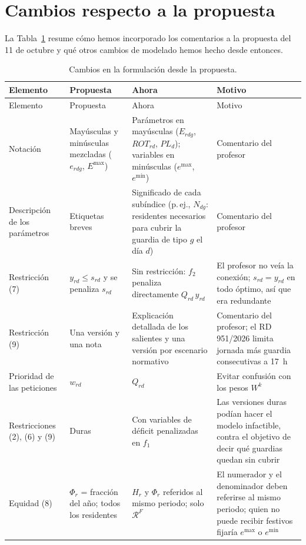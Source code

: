 \clearpage
\appendix
\section{Cambios respecto a la propuesta}
\label{app:feedback}

La Tabla~\ref{tab:cambios} resume cómo hemos incorporado los comentarios a la propuesta del 11 de octubre y qué otros cambios de modelado hemos hecho desde entonces.

{\small
\begin{longtable}{@{}p{2.8cm}p{3.5cm}p{4.2cm}p{4.6cm}@{}}
\caption{Cambios en la formulación desde la propuesta.}\label{tab:cambios}\\
\toprule
Elemento & Propuesta & Ahora & Motivo \\
\midrule
\endfirsthead
\toprule
Elemento & Propuesta & Ahora & Motivo \\
\midrule
\endhead
Notación & Mayúsculas y minúsculas mezcladas ($e_{rdg}$, $E^{\max}$) & Parámetros en mayúsculas ($E_{rdg}$, $ROT_{rd}$, $PL_d$); variables en minúsculas ($e^{\max}$, $e^{\min}$) & Comentario del profesor \\
Descripción de los parámetros & Etiquetas breves & Significado de cada subíndice (p.\,ej., $N_{dg}$: residentes necesarios para cubrir la guardia de tipo $g$ el día $d$) & Comentario del profesor \\
Restricción (7) & $y_{rd} \le s_{rd}$ y se penaliza $s_{rd}$ & Sin restricción: $f_2$ penaliza directamente $Q_{rd}\,y_{rd}$ & El profesor no veía la conexión; $s_{rd} = y_{rd}$ en todo óptimo, así que era redundante \\
Restricción (9) & Una versión y una nota & Explicación detallada de los salientes y una versión por escenario normativo & Comentario del profesor; el RD 951/2026 limita jornada más guardia consecutivas a 17~h \\
Prioridad de las peticiones & $w_{rd}$ & $Q_{rd}$ & Evitar confusión con los pesos $W^k$ \\
Restricciones (2), (6) y (9) & Duras & Con variables de déficit penalizadas en $f_1$ & Las versiones duras podían hacer el modelo infactible, contra el objetivo de decir qué guardias quedan sin cubrir \\
Equidad (8) & $\Phi_r$ = fracción del año; todos los residentes & $H_r$ y $\Phi_r$ referidos al mismo periodo; solo $\mathcal{R}^F$ & El numerador y el denominador deben referirse al mismo periodo; quien no puede recibir festivos fijaría $e^{\max}$ o $e^{\min}$ \\

\end{longtable}}
